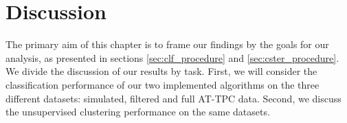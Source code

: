 \chapter{Discussion}
The primary aim of this chapter is to frame our findings by the goals for our analysis, as presented in sections \ref{sec:clf_procedure} and \ref{sec:cster_procedure}. We divide the discussion of our results by task. First, we will consider the classification performance of our two implemented algorithms on the three different datasets: simulated, filtered and full AT-TPC data. Second, we discuss the unsupervised clustering performance on the same datasets. 
